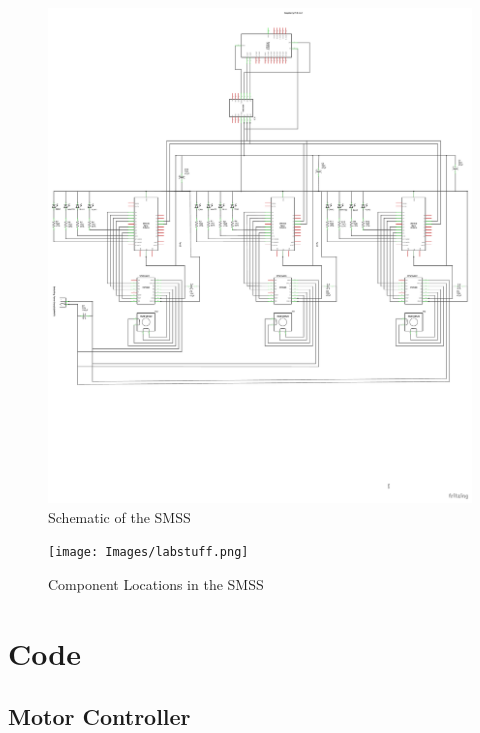 \documentclass[journal]{IEEEtran}
\begin{document}
    \begin{figure}[H]
        \centering
        \includegraphics[scale=0.5]{Images/fritz_schem.pdf}
        \caption{Schematic of the SMSS}
        \label{fig:fritz_schem}
    \end{figure}
    
    \newpage
    \quad
    \newpage
    
    \begin{figure}[H]
        \centering
        \texttt{[image: Images/labstuff.png]}
        \caption{Component Locations in the SMSS}
        \label{fig:physical}
    \end{figure}
    
    \newpage
    \quad
    \newpage



\section{Code}
    \label{Appendix:Code}
    \subsection{Motor Controller}
        
        
\end{document}
